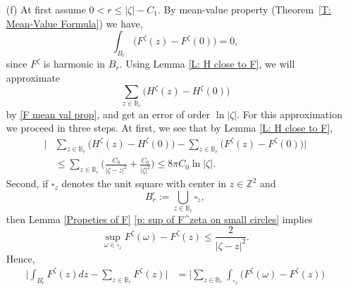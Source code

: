 \documentclass[11pt]{article}
\makeatletter
\renewenvironment{proof}[1][\proofname]{
   \par\pushQED{\qed}\normalfont
   \topsep6\p@\@plus6\p@\relax
   \trivlist\item[\hskip\labelsep\bfseries#1\@addpunct{.}]
   \ignorespaces
}{
   \popQED\endtrivlist\@endpefalse
}
\numberwithin{equation}{section}
\makeatother
\begin{document}
\begin{proof}[Proof of Lemma \ref{Properties of H}]
\begin{itemize}
    \item[(f)] 
      At first assume $0 < r \leq |\zeta| - C_1$.
      By mean-value property \hbox{(Theorem \ref{T: Mean-Value Formula})}
      we have, 
      \begin{equation} \label{F mean val prop}
        \int_{B_r} \big( F^{\zeta}(z) - F^{\zeta}(0) \big) 
        = 0,
      \end{equation} 
      since $F^{\zeta}$ is harmonic in $B_r$.
      Using Lemma \ref{L: H close to F}, we will approximate 
      \begin{equation}\label{mean val of H}
        \sum_{z \in \mathbb{B}_r} 
          \big( H^{\zeta}(z) - H^{\zeta}(0) \big) 
      \end{equation} 
      by \eqref{F mean val prop}, and get an error of order $\ln |\zeta|$. 
      For this approximation we proceed in three steps. 
      At first, we see that by Lemma \ref{L: H close to F},
      \begin{equation}\nonumber
        \begin{split}
          \bigg|& \sum_{z \in \mathbb{B}_r} 
            \big( H^{\zeta}(z) - H^{\zeta}(0) \big) 
          - \sum_{z \in \mathbb{B}_r} 
              \big(F^{\zeta}(z) - F^{\zeta}(0) \big) \bigg|\\
          &\leq  \sum_{z \in \mathbb{B}_r} 
          \bigg( \frac{C_0}{|\zeta - z|^2} + \frac{C_0}{|\zeta|^2} \bigg)
          \leq 8 \pi C_0 \ln |\zeta|.
        \end{split}
      \end{equation}
      Second, if $\square_z$ denotes the unit square 
      with center in $z \in \mathbb{Z}^2$ and 
      \begin{equation}\nonumber
        B^{\square}_r := \bigcup_{z \in \mathbb{B}_r} \square_z,
      \end{equation} 
      then Lemma \ref{Propeties of F} \ref{p: sup of F^zeta on small circles}
      implies 
      \begin{equation}\nonumber
        \sup_{\omega \in \square_z} F^{\zeta}(\omega) -F^{\zeta}(z)
        \leq \frac{2}{|\zeta - z|^2}. 
      \end{equation}
      Hence,
      \begin{equation}\nonumber
      \begin{split}
      \bigg| \int_{B^{\square}_r} F^{\zeta}(z) dz 
          - \sum_{z \in \mathbb{B}_r} F^{\zeta}(z)\bigg|
      &= \bigg| \sum_{z \in \mathbb{B}_r} 
              \int_{\square_z}
              \big(F^{\zeta}(\omega) -F^{\zeta}(z)\big) 

\end{split}
\end{equation}
\end{itemize}
\end{proof}
\end{document}
